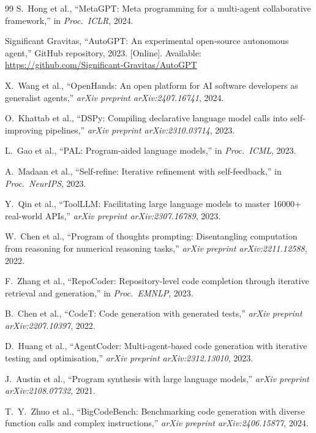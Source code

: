 \documentclass[conference]{IEEEtran}
\begin{document}
\begin{thebibliography}{99}
S.~Hong et al., ``MetaGPT: Meta programming for a multi-agent
collaborative framework,'' in \textit{Proc.\ ICLR}, 2024.

Significant Gravitas, ``AutoGPT: An experimental open-source autonomous
agent,'' GitHub repository, 2023.
[Online]. Available: \url{https://github.com/Significant-Gravitas/AutoGPT}

X.~Wang et al., ``OpenHands: An open platform for AI software developers
as generalist agents,'' \textit{arXiv preprint arXiv:2407.16741}, 2024.

O.~Khattab et al., ``DSPy: Compiling declarative language model calls
into self-improving pipelines,'' \textit{arXiv preprint arXiv:2310.03714},
2023.

L.~Gao et al., ``PAL: Program-aided language models,'' in
\textit{Proc.\ ICML}, 2023.

A.~Madaan et al., ``Self-refine: Iterative refinement with self-feedback,''
in \textit{Proc.\ NeurIPS}, 2023.

Y.~Qin et al., ``ToolLLM: Facilitating large language models to master
16000+ real-world APIs,'' \textit{arXiv preprint arXiv:2307.16789}, 2023.

W.~Chen et al., ``Program of thoughts prompting: Disentangling computation
from reasoning for numerical reasoning tasks,'' \textit{arXiv preprint
arXiv:2211.12588}, 2022.

F.~Zhang et al., ``RepoCoder: Repository-level code completion through
iterative retrieval and generation,'' in \textit{Proc.\ EMNLP}, 2023.

B.~Chen et al., ``CodeT: Code generation with generated tests,''
\textit{arXiv preprint arXiv:2207.10397}, 2022.

D.~Huang et al., ``AgentCoder: Multi-agent-based code generation with
iterative testing and optimisation,'' \textit{arXiv preprint
arXiv:2312.13010}, 2023.

J.~Austin et al., ``Program synthesis with large language models,''
\textit{arXiv preprint arXiv:2108.07732}, 2021.

T.~Y.~Zhuo et al., ``BigCodeBench: Benchmarking code generation with
diverse function calls and complex instructions,'' \textit{arXiv preprint
arXiv:2406.15877}, 2024.


\end{thebibliography}
\end{document}

